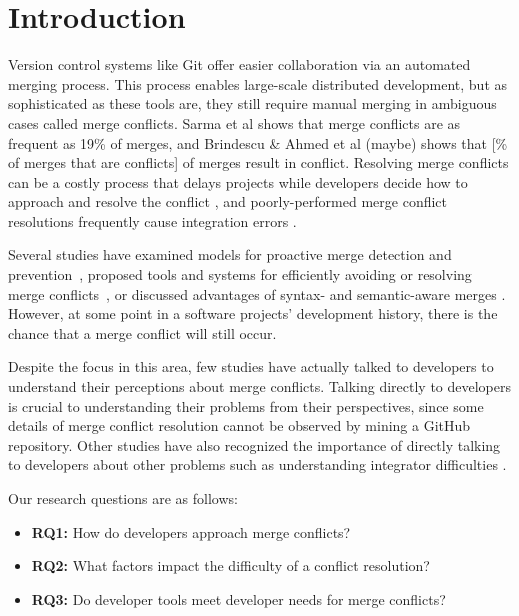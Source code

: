 \section{Introduction}\label{introduction}


Version control systems like Git offer easier collaboration via an automated merging process. This process enables large-scale distributed development, but as sophisticated as these tools are, they still require manual merging in ambiguous cases called merge conflicts. Sarma et al \cite{cassandra} shows that merge conflicts are as frequent as 19\% of merges, and Brindescu \& Ahmed et al (maybe) shows that [\% of merges that are conflicts] of merges result in conflict. Resolving merge conflicts can be a costly process that delays projects while developers decide how to approach and resolve the conflict \cite{cassandra}, and poorly-performed merge conflict resolutions frequently cause integration errors \cite{bird-branches-conflict}.


Several studies have examined models for proactive merge detection and prevention~\cite{Brun2011}\cite{palantir}\cite{Guimaraes}, proposed tools and systems for efficiently avoiding or resolving merge conflicts~\cite{nishimura}\cite{mens2002state}, or discussed advantages of syntax- and semantic-aware merges \cite{danny_refactorings}\cite{hunt2002extensible}. However, at some point in a software projects' development history, there is the chance that a merge conflict will still occur. 


Despite the focus in this area, few studies have actually talked to developers to understand their perceptions about merge conflicts. Talking directly to developers is crucial to understanding their problems from their perspectives, since some details of merge conflict resolution cannot be observed by mining a GitHub repository. Other studies have also recognized the importance of directly talking to developers about other problems such as understanding integrator difficulties \cite{integrator_perspective}.

Our research questions are as follows:
\begin{itemize}
\item\textbf{RQ1:} How do developers approach merge conflicts?\\
\item\textbf{RQ2:} What factors impact the difficulty of a conflict resolution?\\
\item\textbf{RQ3:} Do developer tools meet developer needs for merge conflicts?\\
\end{itemize}

